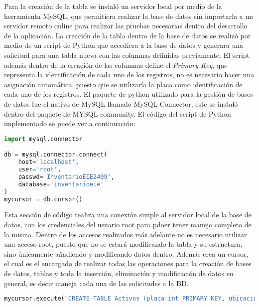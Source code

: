 \par
Para la creación de la tabla se instaló un servidor local por medio de la herramienta MySQL, que permitiera realizar la base de datos sin importarla a un servidor remoto online para realizar las pruebas necesarias dentro del desarrollo de la aplicación. La creación de la tabla dentro de la base de datos se realizó por medio de un script de Python que accediera a la base de datos y generara una solicitud para una tabla nueva con las columnas definidas previamente. El script además dentro de la creación de las columnas define el \textit{Primary Key}, que representa la identificación de cada uno de los registros, no es necesario hacer una asignación automática, puesto que se utilizaría la placa como identificación de cada uno de los registros. El paquete de python utilizado para la gestión de bases de datos fue el nativo de MySQL llamado MySQL Connector, este se instaló dentro del paquete de MYSQL community. El código del script de Python implementado se puede ver a continuación:
\newpage
\begin{lstlisting}[language=Python,frame=single,caption= Script de python para la conexión a una base de datos (creación propia), inputencoding=latin1]
import mysql.connector

db = mysql.connector.connect(
    host='localhost',
    user='root',
    passwd='InventarioEIE2409',
    database='inventarioeie'
)
mycursor = db.cursor()
\end{lstlisting}
\par
Esta sección de código realiza una conexión simple al servidor local de la base de datos, con los credenciales del usuario root para pdoer tener manejo completo de la misma. Dentro de los accesos realizados más adelante no es necesario utilizar una acceso root, puesto que no se estará modificando la tabla y su estructura, sino únicamente añadiendo y modificando datos dentro. Además crea un cursor, el cual es el encargado de realizar todas las operaciones para la creación de bases de datos, tablas y toda la inserción, eliminación y modificación de datos en general, es decir maneja cada una de las solicitudes a la BD. 
\begin{lstlisting}[language=Python,frame=single,caption= Script de python para la creación de una tabla en una base de datos (creación propia), inputencoding=latin1]
mycursor.execute("CREATE TABLE Activos (placa int PRIMARY KEY, ubicacion TEXT(65535), tipo_de_activo TEXT(65535), descripcion TEXT(65535))")
\end{lstlisting}
\par

